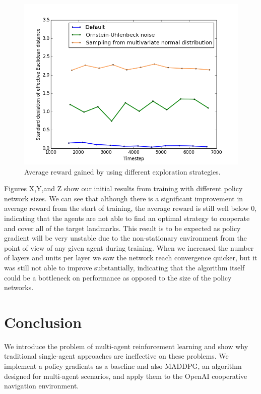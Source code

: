 \documentclass{article}
\begin{document}
\begin{figure}
\begin{center}
\includegraphics[scale=0.4]{action_exploration_std_dev}
\end{center}
\caption{Average reward gained by using different exploration strategies.}
\label{fig:action_exploration_std_dev}
\end{figure}


Figures X,Y,and Z show our initial results from training with different policy network sizes. We can see that although there is a significant improvement in average reward from the start of training, the average reward is still well below 0, indicating that the agents are not able to find an optimal strategy to cooperate and cover all of the target landmarks. This result is to be expected as policy gradient will be very unstable due to the non-stationary environment from the point of view of any given agent during training. When we increased the number of layers and units per layer we saw the network reach convergence quicker, but it was still not able to improve substantially, indicating that the algorithm itself could be a bottleneck on performance as opposed to the size of the policy networks.

\section{Conclusion}
We introduce the problem of multi-agent reinforcement learning and show why traditional single-agent approaches are ineffective on these problems. We implement a policy gradients as a baseline and also MADDPG, an algorithm designed for multi-agent scenarios, and apply them to the OpenAI cooperative navigation environment. 
\end{document}
